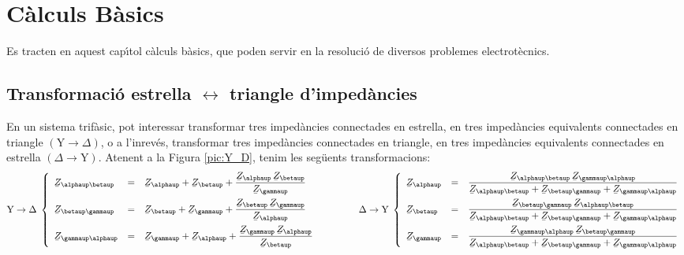 \chapter{C\`{a}lculs B\`{a}sics}\label{sec:calc_bas}

Es tracten en aquest cap\'{\i}tol c\`{a}lculs b\`{a}sics, que poden servir en la
resoluci\'{o} de diversos problemes electrot\`{e}cnics.

\section{\texorpdfstring{Transformaci\'{o} estrella $\boldsymbol{\leftrightarrow}$ triangle d'imped\`{a}ncies}
    {Transformaci\'{o} estrella-triangle d'imped\`{a}ncies}}\label{secc:d_y} 

En un sistema trif\`{a}sic, pot interessar transformar tres imped\`{a}ncies connectades en
estrella, en tres imped\`{a}ncies equivalents connectades en triangle
$(\text{Y}\rightarrow\Delta)$, o a l'inrev\'{e}s, transformar tres imped\`{a}ncies connectades en
triangle, en tres imped\`{a}ncies equivalents connectades en estrella
$(\Delta\rightarrow\text{Y})$. Atenent a la Figura \vref{pic:Y_D}, tenim les seg\"{u}ents
transformacions:
\begin{equation}\label{eq:Y_D}
   \text{Y}\rightarrow\Delta\;\left\{
   \begin{array}{lll}
      \cmplx{Z}_{\alphaup\betaup} &= &\displaystyle \cmplx{Z}_{\alphaup} + \cmplx{Z}_{\betaup} + \frac{\cmplx{Z}_{\alphaup}\,\cmplx{Z}_{\betaup}}{\cmplx{Z}_{\gammaup}}  \\[2.5ex]
      \cmplx{Z}_{\betaup\gammaup} &= &\displaystyle \cmplx{Z}_{\betaup} + \cmplx{Z}_{\gammaup} + \frac{\cmplx{Z}_{\betaup}\,\cmplx{Z}_{\gammaup}}{\cmplx{Z}_{\alphaup}}  \\[2.5ex]
      \cmplx{Z}_{\gammaup\alphaup} &= &\displaystyle \cmplx{Z}_{\gammaup} + \cmplx{Z}_{\alphaup} + \frac{\cmplx{Z}_{\gammaup}\, \cmplx{Z}_{\alphaup}}{\cmplx{Z}_{\betaup}}
   \end{array}
   \right.
   \qquad\qquad
   \Delta\rightarrow\text{Y}\;\left\{
   \begin{array}{lll}
      \cmplx{Z}_{\alphaup} &= &\dfrac{\cmplx{Z}_{\alphaup\betaup}\, \cmplx{Z}_{\gammaup\alphaup}}{  \cmplx{Z}_{\alphaup\betaup} + \cmplx{Z}_{\betaup\gammaup}+ \cmplx{Z}_{\gammaup\alphaup}}  \\[2.5ex]
      \cmplx{Z}_{\betaup} &= &\dfrac{\cmplx{Z}_{\betaup\gammaup}\, \cmplx{Z}_{\alphaup\betaup}}{  \cmplx{Z}_{\alphaup\betaup} + \cmplx{Z}_{\betaup\gammaup}+ \cmplx{Z}_{\gammaup\alphaup}}  \\[2.5ex]
      \cmplx{Z}_{\gammaup} &= &\dfrac{\cmplx{Z}_{\gammaup\alphaup}\, \cmplx{Z}_{\betaup\gammaup}}{  \cmplx{Z}_{\alphaup\betaup} + \cmplx{Z}_{\betaup\gammaup}+ \cmplx{Z}_{\gammaup\alphaup}}
   \end{array}
   \right.
\end{equation}

